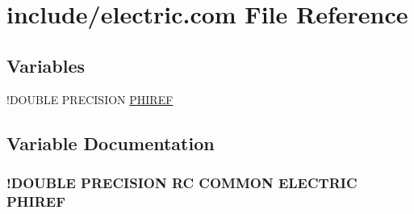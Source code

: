 \hypertarget{electric_8com}{\section{include/electric.com File Reference}
\label{electric_8com}
}
\subsection*{Variables}
\begin{DoxyCompactItemize}
\item 
!D\-O\-U\-B\-L\-E P\-R\-E\-C\-I\-S\-I\-O\-N \hyperlink{electric_8com_a42877c34c1eaaf4f755d3bcc91caa24e}{P\-H\-I\-R\-E\-F}
\end{DoxyCompactItemize}


\subsection{Variable Documentation}
\hypertarget{electric_8com_a42877c34c1eaaf4f755d3bcc91caa24e}{
\subsubsection[{P\-H\-I\-R\-E\-F}]{\setlength{\rightskip}{0pt plus 5cm}!D\-O\-U\-B\-L\-E P\-R\-E\-C\-I\-S\-I\-O\-N R\-C C\-O\-M\-M\-O\-N E\-L\-E\-C\-T\-R\-I\-C P\-H\-I\-R\-E\-F}}\label{electric_8com_a42877c34c1eaaf4f755d3bcc91caa24e}

